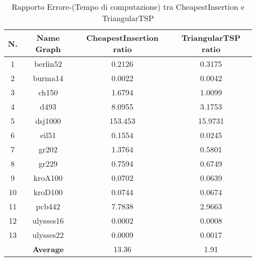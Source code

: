 \begin{table}[H]
	\centering
	\begin{tabular}{|c|c|c|c|}
		\hline
		\textbf{N.} & \textbf{Name Graph} & \textbf{CheapestInsertion ratio} & \textbf{TriangularTSP ratio}\\ 
		\hline
		1 & berlin52 & 0.2126 & 0.3175\\
		\hline
		2 & burma14 & 0.0022 & 0.0042\\
		\hline
		3 & ch150 & 1.6794 & 1.0099\\
		\hline
		4 & d493 & 8.0955 & 3.1753\\
		\hline
		5 & dsj1000 & 153.453 & 15.9731\\
		\hline
		6 & eil51 & 0.1554 & 0.0245\\
		\hline
		7 & gr202 & 1.3764 & 0.5801\\
		\hline
		8 & gr229 & 0.7594 & 0.6749\\
		\hline
		9 & kroA100 & 0.0702 & 0.0639\\
		\hline
		10 & kroD100 & 0.0744 & 0.0674\\
		\hline
		11 & pcb442 & 7.7838 & 2.9663\\
		\hline
		12 & ulysses16 & 0.0002 & 0.0008\\
		\hline
		13 & ulysses22 & 0.0009 & 0.0017\\
		\hline
		& \textbf{Average} & 13.36 & 1.91\\
		\hline
	\end{tabular}
	\caption{Rapporto Errore-(Tempo di computazione) tra CheapestInsertion e TriangularTSP}
	\label{rate}
\end{table} 
